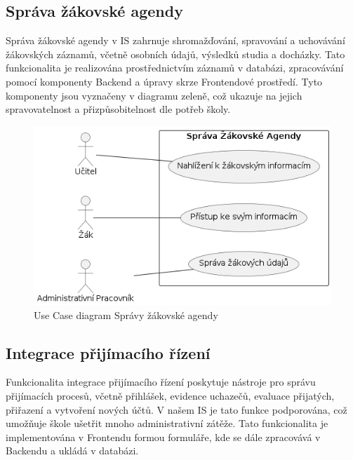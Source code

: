 \documentclass[FM,Proj]{tulthesis}
\begin{document}
\subsection*{Správa žákovské agendy}
Správa žákovské agendy v IS zahrnuje shromažďování, spravování a uchovávání žákovských
záznamů, včetně osobních údajů, výsledků studia a docházky. Tato funkcionalita je realizována
prostřednictvím záznamů v databázi, zpracovávání pomocí komponenty Backend a úpravy skrze
Frontendové prostředí. Tyto komponenty jsou vyznačeny v diagramu zeleně, což ukazuje na jejich
spravovatelnost a přizpůsobitelnost dle potřeb školy.

\begin{figure}[H]
    \includegraphics[width=\textwidth-28pt]{uc-sprava-zakovske-agendy.png}
    \caption{Use Case diagram Správy žákovské agendy}
    \label{fig:uc-sprava-zakovske-agendy}
\end{figure}

\subsection*{Integrace přijímacího řízení}
Funkcionalita integrace přijímacího řízení poskytuje nástroje pro správu přijímacích procesů,
včetně přihlášek, evidence uchazečů, evaluace přijatých, přiřazení a vytvoření nových účtů.
V našem IS je tato funkce podporována, což umožňuje škole ušetřit mnoho administrativní zátěže.
Tato funkcionalita je implementována v Frontendu formou formuláře, kde se dále zpracovává v 
Backendu a ukládá v databázi.
\end{document}
